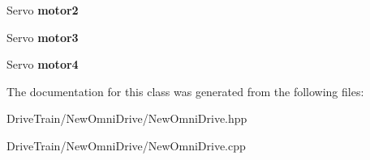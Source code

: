 \begin{DoxyCompactItemize}
\mbox{\label{class_new_omni_drive_ad7de79e2ee9a6f5c08a6e9cd34a08c02}} 
Servo {\bfseries motor2}
\item 
\mbox{\label{class_new_omni_drive_a9a9557669e6ba43ffc496e55cbc296f1}} 
Servo {\bfseries motor3}
\item 
\mbox{\label{class_new_omni_drive_a9386d2b995b7ed02a69dbc18ac1bea42}} 
Servo {\bfseries motor4}
\end{DoxyCompactItemize}


The documentation for this class was generated from the following files\+:\begin{DoxyCompactItemize}
\item 
Drive\+Train/\+New\+Omni\+Drive/New\+Omni\+Drive.\+hpp\item 
Drive\+Train/\+New\+Omni\+Drive/New\+Omni\+Drive.\+cpp\end{DoxyCompactItemize}
